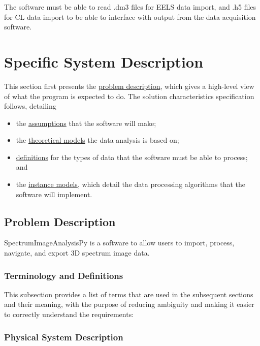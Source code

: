 \documentclass[12pt]{article}
\newcommand{\progname}{SpectrumImageAnalysisPy} %
\begin{document}
The software must be able to read .dm3 files for EELS data import, and .h5 files
for CL data import to be able to interface with output from the data acquisition
software.  

\section{Specific System Description}

This section first presents the \hyperref[ssec:PD]{problem description}, which gives a high-level
view of what the program is expected to do. The solution characteristics
specification follows, detailing 
\begin{itemize}
    \item the \hyperref[sssec:Assumptions]{assumptions} that the software will make;
    \item the \hyperref[sssec:TM]{theoretical models} the data analysis is based on;
    \item \hyperref[sssec:DD]{definitions} for the types of data that the software must be able to process; and
    \item the \hyperref[sssec:IM]{instance models}, which detail the data processing algorithms that the software will implement.
\end{itemize}

\subsection{Problem Description} \label{ssec:PD}

\progname{} is a software to allow users to import, process, navigate, and
export 3D spectrum image data. 

\subsubsection{Terminology and  Definitions}

This subsection provides a list of terms that are used in the subsequent
sections and their meaning, with the purpose of reducing ambiguity and making it
easier to correctly understand the requirements:




\subsubsection{Physical System Description}
\end{document}
